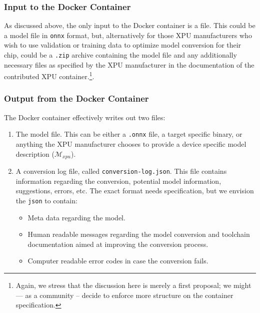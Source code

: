 \documentclass{article}
\begin{document}
\subsubsection{Input to the Docker Container}

As discussed above, the only input to the Docker container is a file. This could be a model file in \texttt{onnx} format, but, alternatively for those XPU manufacturers who wish to use validation or training data to optimize model conversion for their chip, could be a \texttt{.zip} archive containing the model file and any additionally necessary files as specified by the XPU manufacturer in the documentation of the contributed XPU container.\footnote{Again, we stress that the discussion here is merely a first proposal; we might --- as a community -- decide to enforce more structure on the container specification.}.

\subsubsection{Output from the Docker Container}

The Docker container effectively writes out two files:
\begin{enumerate}
\item The model file. This can be either a \texttt{.onnx} file, a target specific binary, or anything the XPU manufacturer chooses to provide a device specific model description ($ \mathcal{M}_{xpu}$).
\item A conversion log file, called \texttt{conversion-log.json}. This file contains information regarding the conversion, potential model information, suggestions, errors, etc. The exact format needs specification, but we envision the \texttt{json} to contain:
	\begin{itemize}
		\item Meta data regarding the model.
		\item Human readable messages regarding the model conversion and toolchain documentation aimed at improving the conversion process.
		\item Computer readable error codes in case the conversion fails.
	\end{itemize}
\end{enumerate}
\end{document}
